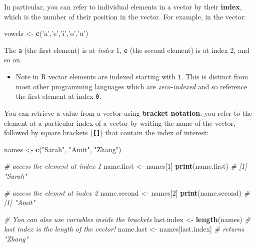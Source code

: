 \documentclass[]{book}
\newenvironment{Shaded}{\begin{snugshade}}{\end{snugshade}}
\newcommand{\KeywordTok}[1]{\textcolor[rgb]{0.13,0.29,0.53}{\textbf{#1}}}
\newcommand{\DecValTok}[1]{\textcolor[rgb]{0.00,0.00,0.81}{#1}}
\newcommand{\StringTok}[1]{\textcolor[rgb]{0.31,0.60,0.02}{#1}}
\newcommand{\CommentTok}[1]{\textcolor[rgb]{0.56,0.35,0.01}{\textit{#1}}}
\newcommand{\NormalTok}[1]{#1}
\providecommand{\tightlist}{%
  \setlength{\itemsep}{0pt}\setlength{\parskip}{0pt}}
\theoremstyle{definition}
\theoremstyle{definition}
\theoremstyle{remark}
\begin{document}
In particular, you can refer to individual elements in a vector by their
\textbf{index}, which is the number of their position in the vector. For
example, in the vector:

\begin{Shaded}
\begin{Highlighting}[]
\NormalTok{vowels <-}\StringTok{ }\KeywordTok{c}\NormalTok{(}\StringTok{'a'}\NormalTok{,}\StringTok{'e'}\NormalTok{,}\StringTok{'i'}\NormalTok{,}\StringTok{'o'}\NormalTok{,}\StringTok{'u'}\NormalTok{)}
\end{Highlighting}
\end{Shaded}

The \texttt{\textquotesingle{}a\textquotesingle{}} (the first element)
is at \emph{index} 1, \texttt{\textquotesingle{}e\textquotesingle{}}
(the second element) is at index 2, and so on.

\begin{itemize}
\tightlist
\item
  Note in R vector elements are indexed starting with \texttt{1}. This
  is distinct from most other programming languages which are
  \emph{zero-indexed} and so reference the first element at index
  \texttt{0}.
\end{itemize}

You can retrieve a value from a vector using \textbf{bracket notation}:
you refer to the element at a particular index of a vector by writing
the name of the vector, followed by square brackets
(\textbf{\texttt{{[}{]}}}) that contain the index of interest:

\begin{Shaded}
\begin{Highlighting}[]
\NormalTok{names <-}\StringTok{ }\KeywordTok{c}\NormalTok{(}\StringTok{"Sarah"}\NormalTok{, }\StringTok{"Amit"}\NormalTok{, }\StringTok{"Zhang"}\NormalTok{)}

\CommentTok{# access the element at index 1}
\NormalTok{name.first <-}\StringTok{ }\NormalTok{names[}\DecValTok{1}\NormalTok{]}
\KeywordTok{print}\NormalTok{(name.first)  }\CommentTok{# [1] "Sarah"}

\CommentTok{# access the elemnt at index 2}
\NormalTok{name.second <-}\StringTok{ }\NormalTok{names[}\DecValTok{2}\NormalTok{]}
\KeywordTok{print}\NormalTok{(name.second)  }\CommentTok{# [1] "Amit"}

\CommentTok{# You can also use variables inside the brackets}
\NormalTok{last.index <-}\StringTok{ }\KeywordTok{length}\NormalTok{(names)  }\CommentTok{# last index is the length of the vector!}
\NormalTok{name.last <-}\StringTok{ }\NormalTok{names[last.index]  }\CommentTok{# returns "Zhang"}
\end{Highlighting}
\end{Shaded}
\end{document}
